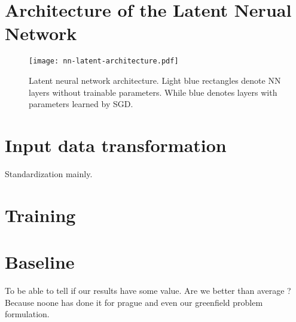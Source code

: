 \section{Architecture of the Latent Nerual Network}

\begin{figure}[hb]
    \texttt{[image: nn-latent-architecture.pdf]}
    \caption[Latent Neural Network Architecture]{Latent neural network architecture. Light blue rectangles denote NN layers without trainable parameters. While blue denotes layers with parameters learned by SGD. }
    \label{fig:nn-latent}
\end{figure}

\section{Input data transformation}

Standardization mainly.

\section{Training}


\section{Baseline}

To be able to tell if our results have some value.
Are we better than average ? Because noone has done it for prague and even our greenfield problem formulation.